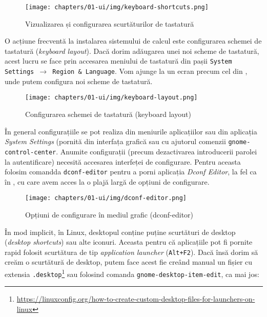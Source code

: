 \begin{figure}[!htbp]
  \centering
  \texttt{[image: chapters/01-ui/img/keyboard-shortcuts.png]}
  \caption{Vizualizarea și configurarea scurtăturilor de tastatură}
  \label{fig:ui:keyboard-shortcuts}
\end{figure}

O acțiune frecventă la instalarea sistemului de calcul este configurarea schemei de tastatură (\textit{keyboard layout}). Dacă dorim adăugarea unei noi scheme de tastatură, acest lucru se face prin accesarea meniului de tastatură din pașii \texttt{System Settings $\rightarrow$ Region \& Language}. Vom ajunge la un ecran precum cel din , unde putem configura noi scheme de tastatură.

\begin{figure}[!htbp]
  \centering
  \texttt{[image: chapters/01-ui/img/keyboard-layout.png]}
  \caption{Configurarea schemei de tastatură (keyboard layout)}
  \label{fig:ui:keyboard-layout}
\end{figure}

În general configurațiile se pot realiza din meniurile aplicațiilor sau din aplicația \textit{System Settings} (pornită din interfața grafică sau cu ajutorul comenzii \texttt{gnome-control-center}. Anumite configurații (precum dezactivarea introducerii parolei la autentificare) necesită accesarea interfeței de configurare. Pentru aceasta folosim comandda \texttt{dconf-editor} pentru a porni aplicația \textit{Dconf Editor}, la fel ca în , cu care avem acces la o plajă largă de opțiuni de configurare.

\begin{figure}[!htbp]
  \centering
  \texttt{[image: chapters/01-ui/img/dconf-editor.png]}
  \caption{Opțiuni de configurare în mediul grafic (dconf-editor)}
  \label{fig:ui:dconf-editor}
\end{figure}

În mod implicit, în Linux, desktopul conține puține scurtături de desktop (\textit{desktop shortcuts}) sau alte iconuri. Aceasta pentru că aplicațiile pot fi pornite rapid folosit scurtătura de tip \textit{application launcher} (\texttt{Alt+F2}). Dacă însă dorim să creăm o scurtătură de desktop, putem face acest fie creând manual un fișier cu extensia \texttt{.desktop}\footnote{\url{https://linuxconfig.org/how-to-create-custom-desktop-files-for-launchers-on-linux}} sau folosind comanda \texttt{gnome-desktop-item-edit}, ca mai jos:

